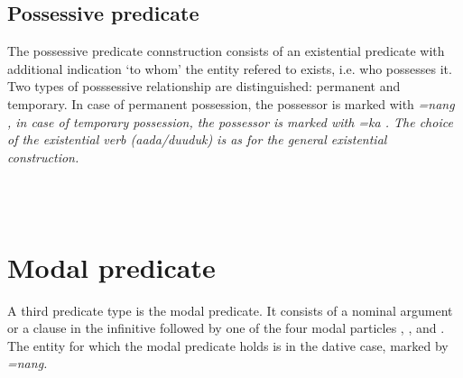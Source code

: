\subsection{Possessive predicate}\label{sec:pred:Possessivepredicate}
The possessive predicate connstruction consists of an existential predicate with additional indication `to whom' the entity refered to exists, i.e. who possesses it. Two types of posssessive relationship are distinguished: permanent and temporary. In case of permanent possession, the possessor is marked with \em =nang \em{} \citep[26]{Ansaldo2005ms}, in case of temporary possession, the possessor is marked with \em =ka \em{}. The choice of the existential verb (\em aada/duuduk\em) is as for the general existential construction.

 \\

 \\
\section{Modal predicate}\label{sec:pred:Modalpredicate}
A third predicate type is the modal predicate. It consists of a nominal argument or a clause in the infinitive followed by one of the four modal particles , ,  and . The entity for which the modal predicate holds is in the dative case, marked by \em =nang\em.


